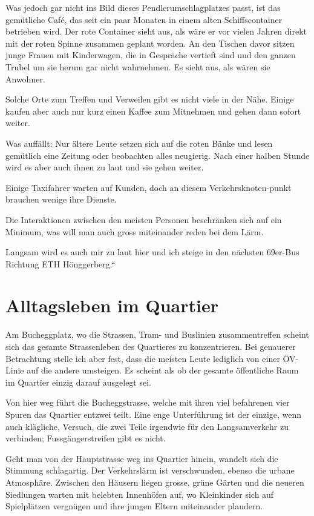 \documentclass[a4paper,ngerman,11pt]{scrartcl}
\begin{document}
Was jedoch gar nicht ins Bild dieses Pendlerumschlagplatzes passt, ist das
gemütliche Café, das seit ein paar Monaten in einem alten Schiffscontainer
betrieben wird. Der rote Container sieht aus, als wäre er vor vielen Jahren
direkt mit der roten Spinne zusammen geplant worden. An den Tischen davor sitzen
junge Frauen mit Kinderwagen, die in Gespräche vertieft sind und den ganzen
Trubel um sie herum gar nicht wahrnehmen. Es sieht aus, als wären sie Anwohner.

Solche Orte zum Treffen und Verweilen gibt es nicht viele in der Nähe. Einige
kaufen aber auch nur kurz einen Kaffee zum Mitnehmen und gehen dann sofort
weiter.

Was auffällt: Nur ältere Leute setzen sich auf die roten Bänke und lesen
gemütlich eine Zeitung oder beobachten alles neugierig. Nach einer halben Stunde
wird es aber auch ihnen zu laut und sie gehen weiter.

Einige Taxifahrer warten auf Kunden, doch an diesem Verkehrsknoten-punkt
brauchen wenige ihre Dienste.

Die Interaktionen zwischen den meisten Personen beschränken sich auf ein
Minimum, was will man auch gross miteinander reden bei dem Lärm.

Langsam wird es auch mir zu laut hier und ich steige in den nächsten 69er-Bus
Richtung ETH Hönggerberg.“

\section*{Alltagsleben im Quartier}

Am Bucheggplatz, wo die Strassen, Tram- und Buslinien zusammentreffen scheint
sich das gesamte Strassenleben des Quartieres zu konzentrieren. Bei genauerer
Betrachtung stelle ich aber fest, dass die meisten Leute lediglich von einer
ÖV-Linie auf die andere umsteigen. Es scheint als ob der gesamte öffentliche
Raum im Quartier einzig darauf ausgelegt sei.

Von hier weg führt die Bucheggstrasse, welche mit ihren viel befahrenen vier
Spuren das Quartier entzwei teilt. Eine enge Unterführung ist der einzige, wenn
auch klägliche, Versuch, die zwei Teile irgendwie für den Langsamverkehr zu
verbinden; Fussgängerstreifen gibt es nicht.

Geht man von der Hauptstrasse weg ins Quartier hinein, wandelt sich die Stimmung
schlagartig. Der Verkehrslärm ist verschwunden, ebenso die urbane
Atmosphäre. Zwischen den Häusern liegen grosse, grüne Gärten und die neueren
Siedlungen warten mit belebten Innenhöfen auf, wo Kleinkinder sich auf
Spielplätzen vergnügen und ihre jungen Eltern miteinander plaudern.
\end{document}
